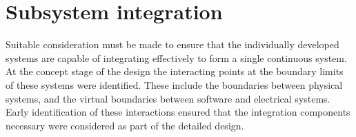 \documentclass[main.tex]{subfiles}
\begin{document}
\section{Subsystem integration}
Suitable consideration must be made to ensure that the individually developed systems are capable of integrating effectively to form a single continuous system. At the concept stage of the design the interacting points at the boundary limits of these systems were identified. These include the boundaries between physical systems, and the virtual boundaries between software and electrical systems. Early identification of these interactions ensured that the integration components necessary were considered as part of the detailed design.



\end{document}
